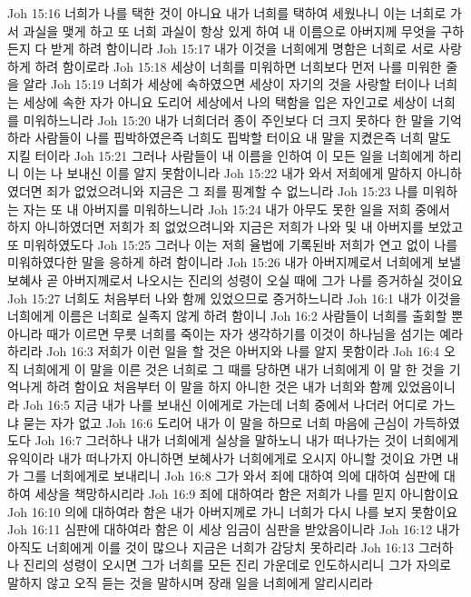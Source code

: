 Joh 15:16  너희가 나를 택한 것이 아니요 내가 너희를 택하여 세웠나니 이는 너희로 가서 과실을 맺게 하고 또 너희 과실이 항상 있게 하여 내 이름으로 아버지께 무엇을 구하든지 다 받게 하려 함이니라
Joh 15:17  내가 이것을 너희에게 명함은 너희로 서로 사랑하게 하려 함이로라
Joh 15:18  세상이 너희를 미워하면 너희보다 먼저 나를 미워한 줄을 알라
Joh 15:19  너희가 세상에 속하였으면 세상이 자기의 것을 사랑할 터이나 너희는 세상에 속한 자가 아니요 도리어 세상에서 나의 택함을 입은 자인고로 세상이 너희를 미워하느니라
Joh 15:20  내가 너희더러 종이 주인보다 더 크지 못하다 한 말을 기억하라 사람들이 나를 핍박하였은즉 너희도 핍박할 터이요 내 말을 지켰은즉 너희 말도 지킬 터이라
Joh 15:21  그러나 사람들이 내 이름을 인하여 이 모든 일을 너희에게 하리니 이는 나 보내신 이를 알지 못함이니라
Joh 15:22  내가 와서 저희에게 말하지 아니하였더면 죄가 없었으려니와 지금은 그 죄를 핑계할 수 없느니라
Joh 15:23  나를 미워하는 자는 또 내 아버지를 미워하느니라
Joh 15:24  내가 아무도 못한 일을 저희 중에서 하지 아니하였더면 저희가 죄 없었으려니와 지금은 저희가 나와 및 내 아버지를 보았고 또 미워하였도다
Joh 15:25  그러나 이는 저희 율법에 기록된바 저희가 연고 없이 나를 미워하였다한 말을 응하게 하려 함이니라
Joh 15:26  내가 아버지께로서 너희에게 보낼 보혜사 곧 아버지께로서 나오시는 진리의 성령이 오실 때에 그가 나를 증거하실 것이요
Joh 15:27  너희도 처음부터 나와 함께 있었으므로 증거하느니라
Joh 16:1  내가 이것을 너희에게 이름은 너희로 실족지 않게 하려 함이니
Joh 16:2  사람들이 너희를 출회할 뿐아니라 때가 이르면 무릇 너희를 죽이는 자가 생각하기를 이것이 하나님을 섬기는 예라 하리라
Joh 16:3  저희가 이런 일을 할 것은 아버지와 나를 알지 못함이라
Joh 16:4  오직 너희에게 이 말을 이른 것은 너희로 그 때를 당하면 내가 너희에게 이 말 한 것을 기억나게 하려 함이요 처음부터 이 말을 하지 아니한 것은 내가 너희와 함께 있었음이니라
Joh 16:5  지금 내가 나를 보내신 이에게로 가는데 너희 중에서 나더러 어디로 가느냐 묻는 자가 없고
Joh 16:6  도리어 내가 이 말을 하므로 너희 마음에 근심이 가득하였도다
Joh 16:7  그러하나 내가 너희에게 실상을 말하노니 내가 떠나가는 것이 너희에게 유익이라 내가 떠나가지 아니하면 보혜사가 너희에게로 오시지 아니할 것이요 가면 내가 그를 너희에게로 보내리니
Joh 16:8  그가 와서 죄에 대하여 의에 대하여 심판에 대하여 세상을 책망하시리라
Joh 16:9  죄에 대하여라 함은 저희가 나를 믿지 아니함이요
Joh 16:10  의에 대하여라 함은 내가 아버지께로 가니 너희가 다시 나를 보지 못함이요
Joh 16:11  심판에 대하여라 함은 이 세상 임금이 심판을 받았음이니라
Joh 16:12  내가 아직도 너희에게 이를 것이 많으나 지금은 너희가 감당치 못하리라
Joh 16:13  그러하나 진리의 성령이 오시면 그가 너희를 모든 진리 가운데로 인도하시리니 그가 자의로 말하지 않고 오직 듣는 것을 말하시며 장래 일을 너희에게 알리시리라
